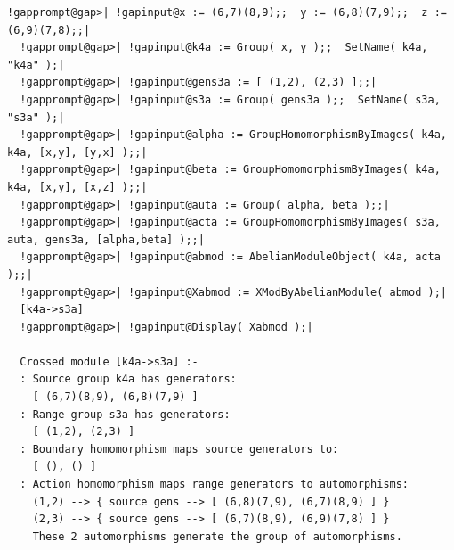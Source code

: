 \documentclass[a4paper,11pt]{report}
\begin{document}
{{\begin{Verbatim}[commandchars=!@|,fontsize=\small,frame=single,label=Example]
  !gapprompt@gap>| !gapinput@x := (6,7)(8,9);;  y := (6,8)(7,9);;  z := (6,9)(7,8);;|
  !gapprompt@gap>| !gapinput@k4a := Group( x, y );;  SetName( k4a, "k4a" );|
  !gapprompt@gap>| !gapinput@gens3a := [ (1,2), (2,3) ];;|
  !gapprompt@gap>| !gapinput@s3a := Group( gens3a );;  SetName( s3a, "s3a" );|
  !gapprompt@gap>| !gapinput@alpha := GroupHomomorphismByImages( k4a, k4a, [x,y], [y,x] );;|
  !gapprompt@gap>| !gapinput@beta := GroupHomomorphismByImages( k4a, k4a, [x,y], [x,z] );;|
  !gapprompt@gap>| !gapinput@auta := Group( alpha, beta );;|
  !gapprompt@gap>| !gapinput@acta := GroupHomomorphismByImages( s3a, auta, gens3a, [alpha,beta] );;|
  !gapprompt@gap>| !gapinput@abmod := AbelianModuleObject( k4a, acta );;|
  !gapprompt@gap>| !gapinput@Xabmod := XModByAbelianModule( abmod );|
  [k4a->s3a]
  !gapprompt@gap>| !gapinput@Display( Xabmod );|
  
  Crossed module [k4a->s3a] :- 
  : Source group k4a has generators:
    [ (6,7)(8,9), (6,8)(7,9) ]
  : Range group s3a has generators:
    [ (1,2), (2,3) ]
  : Boundary homomorphism maps source generators to:
    [ (), () ]
  : Action homomorphism maps range generators to automorphisms:
    (1,2) --> { source gens --> [ (6,8)(7,9), (6,7)(8,9) ] }
    (2,3) --> { source gens --> [ (6,7)(8,9), (6,9)(7,8) ] }
    These 2 automorphisms generate the group of automorphisms.
  
  
\end{Verbatim}
 }

 }

         
\end{document}
